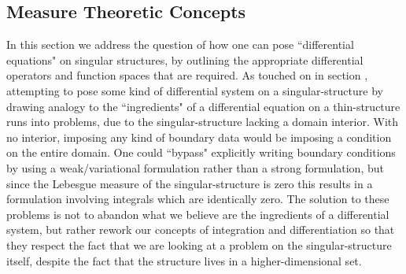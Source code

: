 \subsection{Measure Theoretic Concepts} \label{ssec:MeasureTheory}
In this section we address the question of how one can pose ``differential equations" on singular structures, by outlining the appropriate differential operators and function spaces that are required.
As touched on in section , attempting to pose some kind of differential system on a singular-structure by drawing analogy to the ``ingredients" of a differential equation on a thin-structure runs into problems, due to the singular-structure lacking a domain interior.
With no interior, imposing any kind of boundary data would be imposing a condition on the entire domain.
One could ``bypass" explicitly writing boundary conditions by using a weak/variational formulation rather than a strong formulation, but since the Lebesgue measure of the singular-structure is zero this results in a formulation involving integrals which are identically zero.
The solution to these problems is not to abandon what we believe are the ingredients of a differential system, but rather rework our concepts of integration and differentiation so that they respect the fact that we are looking at a problem on the singular-structure itself, despite the fact that the structure lives in a higher-dimensional set. 

